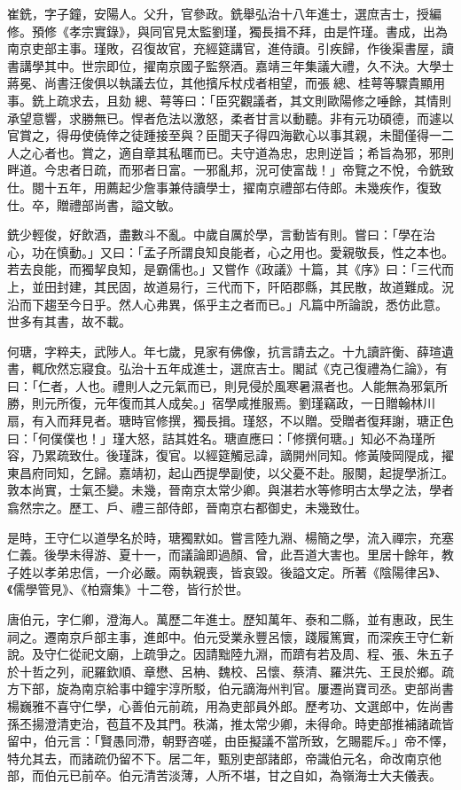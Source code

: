 \begin{pinyinscope}
崔銑，字子鐘，安陽人。父升，官參政。銑舉弘治十八年進士，選庶吉士，授編修。預修《孝宗實錄》，與同官見太監劉瑾，獨長揖不拜，由是忤瑾。書成，出為南京吏部主事。瑾敗，召復故官，充經筵講官，進侍讀。引疾歸，作後渠書屋，讀書講學其中。世宗即位，擢南京國子監祭酒。嘉靖三年集議大禮，久不決。大學士蔣冕、尚書汪俊俱以執議去位，其他擯斥杖戍者相望，而張總、桂萼等驟貴顯用事。銑上疏求去，且劾總、萼等曰：「臣究觀議者，其文則歐陽修之唾餘，其情則承望意響，求勝無已。悍者危法以激怒，柔者甘言以動聽。非有元功碩德，而遽以官賞之，得毋使僥倖之徒踵接至與？臣聞天子得四海歡心以事其親，未聞僅得一二人之心者也。賞之，適自章其私暱而已。夫守道為忠，忠則逆旨；希旨為邪，邪則畔道。今忠者日疏，而邪者日富。一邪亂邦，況可使富哉！」帝覽之不悅，令銑致仕。閱十五年，用薦起少詹事兼侍讀學士，擢南京禮部右侍郎。未幾疾作，復致仕。卒，贈禮部尚書，謚文敏。

銑少輕俊，好飲酒，盡數斗不亂。中歲自厲於學，言動皆有則。嘗曰：「學在治心，功在慎動。」又曰：「孟子所謂良知良能者，心之用也。愛親敬長，性之本也。若去良能，而獨挈良知，是霸儒也。」又嘗作《政議》十篇，其《序》曰：「三代而上，並田封建，其民固，故道易行，三代而下，阡陌郡縣，其民散，故道難成。況沿而下趨至今日乎。然人心弗異，係乎主之者而已。」凡篇中所論說，悉仿此意。世多有其書，故不載。

何瑭，字粹夫，武陟人。年七歲，見家有佛像，抗言請去之。十九讀許衡、薛瑄遺書，輒欣然忘寢食。弘治十五年成進士，選庶吉士。閣試《克己復禮為仁論》，有曰：「仁者，人也。禮則人之元氣而已，則見侵於風寒暑濕者也。人能無為邪氣所勝，則元所復，元年復而其人成矣。」宿學咸推服焉。劉瑾竊政，一日贈翰林川扇，有入而拜見者。瑭時官修撰，獨長揖。瑾怒，不以贈。受贈者復拜謝，瑭正色曰：「何僕僕也！」瑾大怒，詰其姓名。瑭直應曰：「修撰何瑭。」知必不為瑾所容，乃累疏致仕。後瑾誅，復官。以經筵觸忌諱，謫開州同知。修黃陵岡隄成，擢東昌府同知，乞歸。嘉靖初，起山西提學副使，以父憂不赴。服闋，起提學浙江。敦本尚實，士氣丕變。未幾，晉南京太常少卿。與湛若水等修明古太學之法，學者翕然宗之。歷工、戶、禮三部侍郎，晉南京右都御史，未幾致仕。

是時，王守仁以道學名於時，瑭獨默如。嘗言陸九淵、楊簡之學，流入禪宗，充塞仁義。後學未得游、夏十一，而議論即過顏、曾，此吾道大害也。里居十餘年，教子姓以孝弟忠信，一介必嚴。兩執親喪，皆哀毀。後謚文定。所著《陰陽律呂》、《儒學管見》、《柏齋集》十二卷，皆行於世。

唐伯元，字仁卿，澄海人。萬歷二年進士。歷知萬年、泰和二縣，並有惠政，民生祠之。遷南京戶部主事，進郎中。伯元受業永豐呂懷，踐履篤實，而深疾王守仁新說。及守仁從祀文廟，上疏爭之。因請黜陸九淵，而躋有若及周、程、張、朱五子於十哲之列，祀羅欽順、章懋、呂柟、魏校、呂懷、蔡清、羅洪先、王艮於鄉。疏方下部，旋為南京給事中鐘宇淳所駁，伯元謫海州判官。屢遷尚寶司丞。吏部尚書楊巍雅不喜守仁學，心善伯元前疏，用為吏部員外郎。歷考功、文選郎中，佐尚書孫丕揚澄清吏治，苞苴不及其門。秩滿，推太常少卿，未得命。時吏部推補諸疏皆留中，伯元言：「賢愚同滯，朝野咨嗟，由臣擬議不當所致，乞賜罷斥。」帝不懌，特允其去，而諸疏仍留不下。居二年，甄別吏部諸郎，帝識伯元名，命改南京他部，而伯元已前卒。伯元清苦淡薄，人所不堪，甘之自如，為嶺海士大夫儀表。


\end{pinyinscope}
